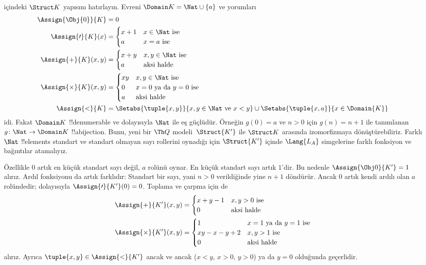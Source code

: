 \begin{ex}
 içindeki $\Struct K$ yapısını hatırlayın.
Evreni $\Domain K=\Nat\cup\{a\}$ ve yorumları
\begin{align*}
  \Assign{\Obj{0}}{K} & = 0\\
  \Assign{\prime}{K}(x) & =
  \begin{cases}
    x+1 & \text{$x\in\Nat$ ise}\\
    a & \text{$x=a$ ise}
  \end{cases}\\
  \Assign{+}{K}(x, y) & =
  \begin{cases}
    x+y & \text{$x,y\in\Nat$ ise}\\
    a & \text{aksi halde}
  \end{cases}\\
  \Assign{\times}{K}(x, y) & =
  \begin{cases}
    xy & \text{$x,y\in\Nat$ ise}\\
    0 & \text{$x=0$ ya da $y=0$ ise}\\
    a & \text{aksi halde}\\
  \end{cases}\\
  \Assign{<}{K} & =
  \Setabs{\tuple{x,y}}{x, y \in \Nat \text{ ve } x<y} \cup
  \Setabs{\tuple{x,a}}{x \in \Domain{K}}
\end{align*}
idi. Fakat $\Domain K$ !!{denumerable} ve dolayısıyla $\Nat$ ile eş
güçlüdür. Örneğin $g(0)=a$ ve $n>0$ için $g(n)=n+1$ ile tanımlanan
$g\colon\Nat\to\Domain K$ !!a{bijection}. Bunu, yeni bir $\Th Q$
modeli~$\Struct{K'}$ ile $\Struct K$ arasında izomorfizmaya
dönüştürebiliriz. Farklı $\Nat$ !!{element}s standart ve standart
olmayan sayı rollerini oynadığı için $\Struct{K'}$ içinde
$\Lang{L_A}$ simgelerine farklı fonksiyon ve bağıntılar atamalıyız.

Özellikle $0$ artık en küçük standart sayı değil, $a$ rolünü oynar.
En küçük standart sayı artık $1$'dir. Bu nedenle
$\Assign{\Obj0}{K'}=1$ alırız. Ardıl fonksiyonu da artık farklıdır:
Standart bir sayı, yani $n>0$ verildiğinde yine $n+1$ döndürür. Ancak
$0$ artık kendi ardılı olan $a$ rolündedir; dolayısıyla
$\Assign{\prime}{K'}(0)=0$. Toplama ve çarpma için de
\begin{align*}
\Assign{+}{K'}(x, y) & =
  \begin{cases}
    x+y-1 & \text{$x,y>0$ ise}\\
    0 & \text{aksi halde}
  \end{cases}\\
  \Assign{\times}{K'}(x, y) & =
  \begin{cases}
    1 & \text{$x=1$ ya da $y=1$ ise}\\
    xy-x-y+2 & \text{$x,y>1$ ise}\\
    0 & \text{aksi halde}\\
  \end{cases}
\end{align*}
alırız. Ayrıca $\tuple{x,y}\in\Assign{<}{K'}$ ancak ve ancak
($x<y$, $x>0$, $y>0$) ya da $y=0$ olduğunda geçerlidir.


\end{ex}

